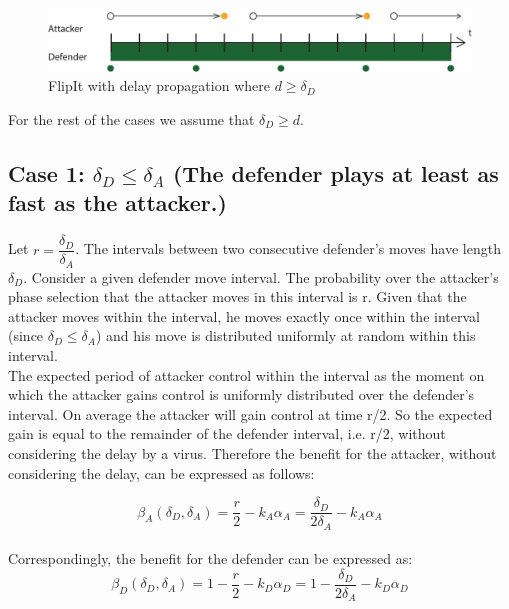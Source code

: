\begin{figure}[hbtp]
\centering
\includegraphics[scale=0.7]{Images/FlipItCase1delaytobig.pdf} 
\caption{FlipIt with delay propagation where $ d \geq \delta_{D}$ }
\label{langeredelay}
\end{figure}

For the rest of the cases we assume that $\delta_{D} \geq d$.

\subsection*{\textbf{Case 1:} $\delta_{D} \leq \delta_{A} $ (The defender plays at least as fast as the attacker.) }

Let $r = \dfrac{\delta_{D}}{ \delta_{A} }$. The intervals between two consecutive defender's moves have length $\delta_{D}$. Consider a given defender move interval. The probability over the attacker's phase selection that the attacker moves in this interval is r. Given that the attacker moves within the interval, he moves exactly once within the interval (since $\delta_{D} \leq \delta_{A} $) and his move is distributed uniformly at random within this interval. \\

The expected period of attacker control within the interval as the moment on which the attacker gains control is uniformly distributed over the defender's interval. On average the attacker will gain control at time r/2. So the expected gain is equal to the remainder of the defender interval, i.e. r/2, without considering the delay by a virus. Therefore the benefit for the attacker, without considering the delay, can be expressed as follows:

\begin{equation*}
\beta_{A}(\delta_{D},\delta_{A}) =\dfrac {r} {2} - k_{A} \alpha_{A} = \dfrac {\delta_{D}} {2\delta_{A}} - k_{A} \alpha_{A}  
\end{equation*}\\

Correspondingly, the benefit for the defender can be expressed as:
\begin{equation*}
\beta_{D}(\delta_{D},\delta_{A}) =1 -  \dfrac {r} {2} - k_{D} \alpha_{D} = 1 - \dfrac {\delta_{D}} {2\delta_{A}} - k_{D} \alpha_{D} 
\end{equation*}

